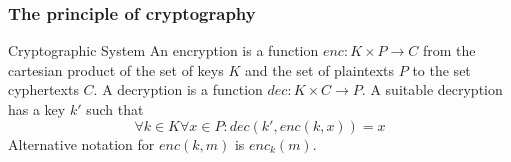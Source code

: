 \documentclass{beamer}
\begin{document}
\begin{frame}
\frametitle{The principle of cryptography}





\begin{block}{Cryptographic System}
An encryption is a function $enc:K\times P\to C$ from the cartesian product of the set of keys $K$ and the set of plaintexts $P$ to the set cyphertexts $C$. A decryption is a function $dec: K\times C\to P$. A suitable decryption has a key $k'$ such that \[\forall k\in K\forall x\in P: dec(k',enc(k,x))=x\]
Alternative notation for $enc(k,m)$ is $enc_k(m)$.
\end{block}

\end{frame}
\end{document}
